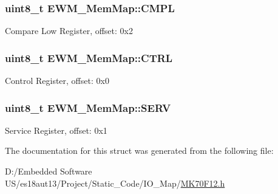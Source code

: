 \subsubsection[{C\+M\+P\+L}]{\setlength{\rightskip}{0pt plus 5cm}uint8\+\_\+t E\+W\+M\+\_\+\+Mem\+Map\+::\+C\+M\+P\+L}\label{struct_e_w_m___mem_map_ada0221f7554297f23a0257f54f28f5fc}
Compare Low Register, offset\+: 0x2 \hypertarget{struct_e_w_m___mem_map_a033a88d44ad1daa23ce3deb13bc94811}{}
\subsubsection[{C\+T\+R\+L}]{\setlength{\rightskip}{0pt plus 5cm}uint8\+\_\+t E\+W\+M\+\_\+\+Mem\+Map\+::\+C\+T\+R\+L}\label{struct_e_w_m___mem_map_a033a88d44ad1daa23ce3deb13bc94811}
Control Register, offset\+: 0x0 \hypertarget{struct_e_w_m___mem_map_aa9c25d4775f785d6911e096a226f4e40}{}
\subsubsection[{S\+E\+R\+V}]{\setlength{\rightskip}{0pt plus 5cm}uint8\+\_\+t E\+W\+M\+\_\+\+Mem\+Map\+::\+S\+E\+R\+V}\label{struct_e_w_m___mem_map_aa9c25d4775f785d6911e096a226f4e40}
Service Register, offset\+: 0x1 

The documentation for this struct was generated from the following file\+:\begin{DoxyCompactItemize}
\item 
D\+:/\+Embedded Software U\+S/es18aut13/\+Project/\+Static\+\_\+\+Code/\+I\+O\+\_\+\+Map/\hyperlink{_m_k70_f12_8h}{M\+K70\+F12.\+h}\end{DoxyCompactItemize}
